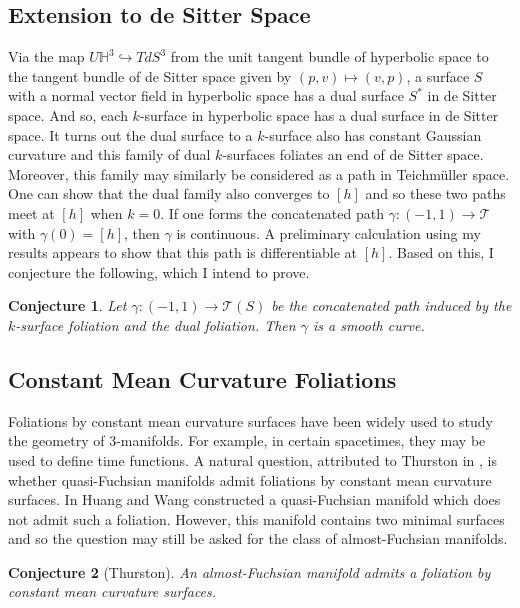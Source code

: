 \documentclass[11pt]{amsart}
\renewcommand{\H}{\mathbb{H}}
\newtheorem{conj}{Conjecture}
\begin{document}
\subsection{Extension to de Sitter Space}
Via the map $U\H^3 \hookrightarrow T dS^3$ from the unit tangent bundle of hyperbolic space to the tangent bundle of de Sitter space given by $(p,v) \mapsto (v,p)$, a surface $S$ with a normal vector field in hyperbolic space has a dual surface $S^*$ in de Sitter space. 
And so, each $k$-surface in hyperbolic space has a dual surface in de Sitter space. 
It turns out the dual surface to a $k$-surface also has constant Gaussian curvature and this family of dual $k$-surfaces foliates an end of de Sitter space. 
Moreover, this family may similarly be considered as a path in Teichm\"uller space. 
One can show that the dual family also converges to $[h]$ and so these two paths meet at $[h]$ when $k = 0$. 
If one forms the concatenated path $\gamma :(-1,1) \to \mathcal{T}$ with $\gamma(0) = [h]$, then $\gamma$ is continuous. 
A preliminary calculation using my results appears to show that this path is differentiable at $[h]$. 
Based on this, I conjecture the following, which I intend to prove.

\begin{conj}
\label{deSitter path}
Let $\gamma: (-1,1) \to \mathcal{T}(S)$ be the concatenated path induced by the $k$-surface foliation and the dual foliation. 
Then $\gamma$ is a smooth curve. 
\end{conj}



\subsection{Constant Mean Curvature Foliations}
Foliations by constant mean curvature surfaces have been widely used to study the geometry of 3-manifolds. 
For example, in certain spacetimes, they may be used to define time functions. A natural question, attributed to Thurston in \cite{huang-wang2013}, is
whether quasi-Fuchsian manifolds admit foliations by constant mean curvature surfaces. 
In \cite{huang-wang2013} Huang and Wang constructed a quasi-Fuchsian manifold which does not admit such a foliation. 
However, this manifold contains two minimal surfaces and so the question may still be asked for the class of almost-Fuchsian manifolds.
\begin{conj}[Thurston]
\label{almost Fuchsian cmc}
An almost-Fuchsian manifold admits a foliation by constant mean curvature surfaces.
\end{conj}
\end{document}
